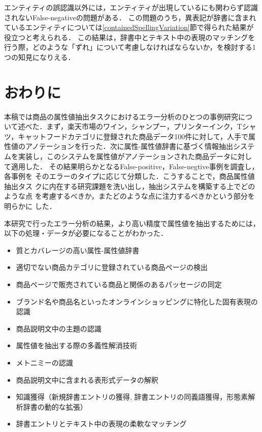 \documentclass[japanese]{jnlp_1.4}
\begin{document}
エンティティの誤認識以外には，エンティティが出現しているにも関わらず認識されないFalse-negativeの問題がある．
この問題のうち，異表記が辞書に含まれているエンティティについては\ref{containedSpellingVariation}節で得られた結果が役立つと考えられる．
この結果は，辞書中とテキスト中の表現のマッチングを行う際，どのような「ずれ」について考慮しなければならないか，を検討する1つの知見になりえる．



\section{おわりに}

本稿では商品の属性値抽出タスクにおけるエラー分析のひとつの事例研究につ
いて述べた．まず，楽天市場のワイン，シャンプー，プリンターインク，Tシャ
ツ，キャットフードカテゴリに登録された商品データ100件に対して，人手で属
性値のアノテーションを行った．次に属性-属性値辞書に基づく情報抽出システ
ムを実装し，このシステムを属性値がアノテーションされた商品データに対し
て適用した．
その結果明らかとなるFalse-positive，False-negtive事例を調査し，各事例を
そのエラーのタイプに応じて分類した．こうすることで，商品属性値抽出タス
クに内在する研究課題を洗い出し，抽出システムを構築する上でどのような点
を考慮するべきか，またどのような点に注力するべきかという部分を明らかに
した．



本研究で行ったエラー分析の結果，より高い精度で属性値を抽出するためには，
以下の処理・データが必要になることがわかった．

\begin{itemize}
\item 質とカバレージの高い属性-属性値辞書
\item 適切でない商品カテゴリに登録されている商品ページの検出
\item 商品ページで販売されている商品と関係のあるパッセージの同定
\item ブランド名や商品名といったオンラインショッピングに特化した固有表現の認識
\item 商品説明文中の主題の認識
\item 属性値を抽出する際の多義性解消技術
\item メトニミーの認識
\item 商品説明文中に含まれる表形式データの解釈
\item 知識獲得（新規辞書エントリの獲得, 辞書エントリの同義語獲得，形態素解析辞書の動的な拡張）
\item 辞書エントリとテキスト中の表現の柔軟なマッチング
\end{itemize}
\end{document}
